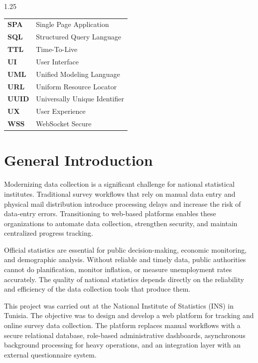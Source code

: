 \documentclass[12pt,a4paper]{report}
\begin{document}
\begin{spacing}{1.25}
\begin{minipage}[t]{0.48\textwidth}
\begin{tabular}{p{2.0cm} p{5.0cm}}
\textbf{SPA} & Single Page Application \\
\textbf{SQL} & Structured Query Language \\
\textbf{TTL} & Time-To-Live \\
\textbf{UI} & User Interface \\
\textbf{UML} & Unified Modeling Language \\
\textbf{URL} & Uniform Resource Locator \\
\textbf{UUID} & Universally Unique Identifier \\
\textbf{UX} & User Experience \\
\textbf{WSS} & WebSocket Secure \\
\end{tabular}
\end{minipage}
\end{spacing}

\clearpage

\chapter*{General Introduction}

Modernizing data collection is a significant challenge for national statistical institutes. Traditional survey workflows that rely on manual data entry and physical mail distribution introduce processing delays and increase the risk of data-entry errors. Transitioning to web-based platforms enables these organizations to automate data collection, strengthen security, and maintain centralized progress tracking.

Official statistics are essential for public decision-making, economic monitoring, and demographic analysis. Without reliable and timely data, public authorities cannot do planification, monitor inflation, or measure unemployment rates accurately. The quality of national statistics depends directly on the reliability and efficiency of the data collection tools that produce them.

This project was carried out at the National Institute of Statistics (INS) \cite{ins} in Tunisia. The objective was to design and develop a web platform for tracking and online survey data collection. The platform replaces manual workflows with a secure relational database, role-based administrative dashboards, asynchronous background processing for heavy operations, and an integration layer with an external questionnaire system.
\end{document}
